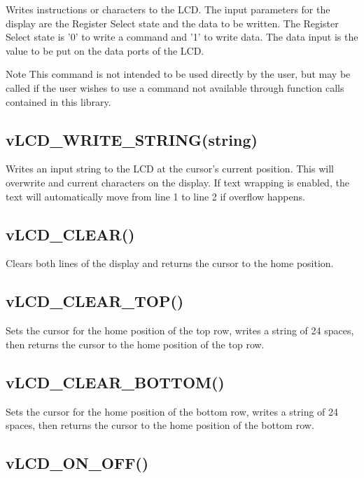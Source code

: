 Writes instructions or characters to the L\-C\-D. The input parameters for the display are the Register Select state and the data to be written. The Register Select state is '0' to write a command and '1' to write data. The data input is the value to be put on the data ports of the L\-C\-D. \begin{DoxyNote}{Note}
This command is not intended to be used directly by the user, but may be called if the user wishes to use a command not available through function calls contained in this library.
\end{DoxyNote}
\hypertarget{_usage_write_string}{}\subsection{v\-L\-C\-D\-\_\-\-W\-R\-I\-T\-E\-\_\-\-S\-T\-R\-I\-N\-G(string)}\label{_usage_write_string}
Writes an input string to the L\-C\-D at the cursor's current position. This will overwrite and current characters on the display. If text wrapping is enabled, the text will automatically move from line 1 to line 2 if overflow happens.\hypertarget{_flowcharts_clear}{}\subsection{v\-L\-C\-D\-\_\-\-C\-L\-E\-A\-R()}\label{_flowcharts_clear}
Clears both lines of the display and returns the cursor to the home position.\hypertarget{_flowcharts_clear_top}{}\subsection{v\-L\-C\-D\-\_\-\-C\-L\-E\-A\-R\-\_\-\-T\-O\-P()}\label{_flowcharts_clear_top}
Sets the cursor for the home position of the top row, writes a string of 24 spaces, then returns the cursor to the home position of the top row.\hypertarget{_flowcharts_clear_bottom}{}\subsection{v\-L\-C\-D\-\_\-\-C\-L\-E\-A\-R\-\_\-\-B\-O\-T\-T\-O\-M()}\label{_flowcharts_clear_bottom}
Sets the cursor for the home position of the bottom row, writes a string of 24 spaces, then returns the cursor to the home position of the bottom row.\hypertarget{_flowcharts_onoff}{}\subsection{v\-L\-C\-D\-\_\-\-O\-N\-\_\-\-O\-F\-F()}\label{_flowcharts_onoff}
